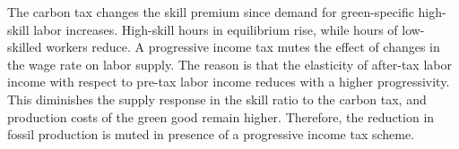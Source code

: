    The carbon tax changes the skill premium since demand for green-specific high-skill labor increases. High-skill hours in equilibrium rise, while hours of low-skilled workers reduce.  A progressive income tax mutes the effect of changes in the wage rate on labor supply. The reason is that the elasticity of after-tax labor income with respect to pre-tax labor income reduces with a higher progressivity. This diminishes the supply response in the skill ratio to the carbon tax, and production costs of the green good remain higher. Therefore, the reduction in fossil production is muted in presence of a progressive income tax scheme. 
   
 
% 
%  
  
